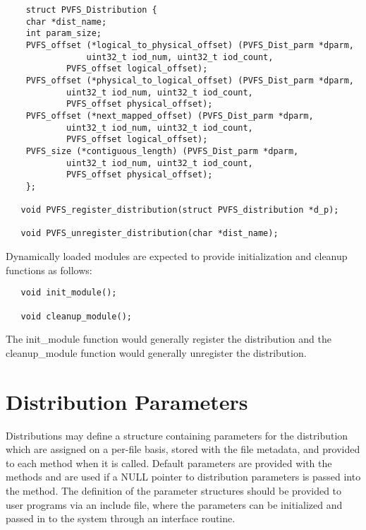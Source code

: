 \documentclass[11pt]{article}
\begin{document}
\begin{verbatim}
	struct PVFS_Distribution {
   	char *dist_name;
   	int param_size;
   	PVFS_offset (*logical_to_physical_offset) (PVFS_Dist_parm *dparm,
        		uint32_t iod_num, uint32_t iod_count,
         	PVFS_offset logical_offset);
   	PVFS_offset (*physical_to_logical_offset) (PVFS_Dist_parm *dparm,
         	uint32_t iod_num, uint32_t iod_count,
         	PVFS_offset physical_offset);
   	PVFS_offset (*next_mapped_offset) (PVFS_Dist_parm *dparm,
         	uint32_t iod_num, uint32_t iod_count,
         	PVFS_offset logical_offset);
   	PVFS_size (*contiguous_length) (PVFS_Dist_parm *dparm,
         	uint32_t iod_num, uint32_t iod_count,
         	PVFS_offset physical_offset);
	};

   void PVFS_register_distribution(struct PVFS_distribution *d_p);

   void PVFS_unregister_distribution(char *dist_name);
\end{verbatim}

Dynamically loaded modules are expected to provide initialization and
cleanup functions as follows:

\begin{verbatim}
   void init_module();

   void cleanup_module();
\end{verbatim}

The init\_module function would generally register the distribution and
the cleanup\_module function would generally unregister the
distribution.

\section{Distribution Parameters}

Distributions may define a structure containing parameters for the
distribution which are assigned on a per-file basis, stored with the
file metadata, and provided to each method when it is called.  Default
parameters are provided with the methods and are used if a NULL pointer
to distribution parameters is passed into the method.  The definition of
the parameter structures should be provided to user programs via an
include file, where the parameters can be initialized and passed in to
the system through an interface routine.
\end{document}

